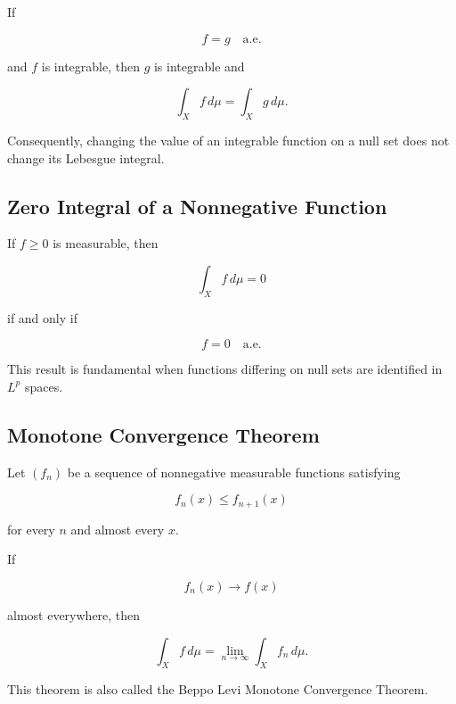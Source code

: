 If

\[
f=g
\quad\text{a.e.}
\]

and \(f\) is integrable, then \(g\) is integrable and

\[
\boxed{
\int_Xf\,d\mu
=
\int_Xg\,d\mu.
}
\]

Consequently, changing the value of an integrable function on a null set
does not change its Lebesgue integral.

\subsection{Zero Integral of a Nonnegative Function}
\label{subsec:zero-integral-nonnegative}

\begin{theorem}
If \(f\geq0\) is measurable, then

\[
\boxed{
\int_Xf\,d\mu=0
}
\]

if and only if

\[
\boxed{
f=0
\quad\text{a.e.}
}
\]
\end{theorem}

This result is fundamental when functions differing on null sets are
identified in \(L^p\) spaces.

\subsection{Monotone Convergence Theorem}
\label{subsec:monotone-convergence-lebesgue}

\begin{theorem}
Let \((f_n)\) be a sequence of nonnegative measurable functions satisfying

\[
f_n(x)\leq f_{n+1}(x)
\]

for every \(n\) and almost every \(x\).

If

\[
f_n(x)\to f(x)
\]

almost everywhere, then

\[
\boxed{
\int_Xf\,d\mu
=
\lim_{n\to\infty}
\int_Xf_n\,d\mu.
}
\]
\end{theorem}

This theorem is also called the Beppo Levi Monotone Convergence Theorem.

